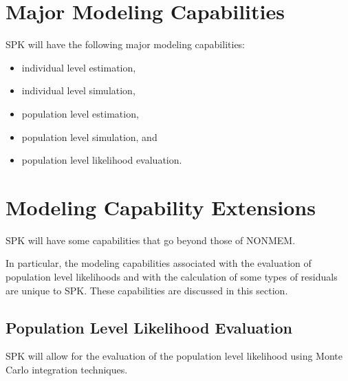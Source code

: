 \documentclass{article}
\begin{document}
%
\section{Major Modeling Capabilities}
%

SPK will have the following major modeling capabilities:
\begin{itemize}
  \item individual level estimation,
  \item individual level simulation,
  \item population level estimation,
  \item population level simulation, and
  \item population level likelihood evaluation.
\end{itemize}


%
\section{Modeling Capability Extensions}
%

SPK will have some capabilities that go beyond those of NONMEM.

In particular, the modeling capabilities associated with the 
evaluation of population level likelihoods and with the 
calculation of some types of residuals are unique to SPK.
These capabilities are discussed in this section.


\subsection{Population Level Likelihood Evaluation}

SPK will allow for the evaluation of the population level likelihood
using Monte Carlo integration techniques.

%
\begin{center}
\end{center}
%


\end{document}
